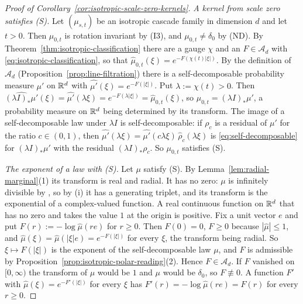 \begin{proof}[Proof of Corollary~\ref{cor:isotropic-scale-zero-kernels}]
\emph{A kernel from scale zero satisfies (S).} Let $(\mu_{s,t})$ be an isotropic cascade family in
dimension $d$ and let $t > 0$. Then $\mu_{0,t}$ is rotation invariant by (I3), and
$\mu_{0,t} \ne \delta_0$ by (ND). By Theorem~\ref{thm:isotropic-classification} there are a gauge $\chi$
and an $F \in \mathcal{A}_d$ with \ref{eq:isotropic-classification}, so that
$\widehat\mu_{0,t}(\xi) = e^{-F(\chi(t)|\xi|)}$. By the definition of $\mathcal{A}_d$
(Proposition~\ref{prop:line-filtration}) there is a self-decomposable probability measure $\mu'$ on
$\mathbb{R}^d$ with $\widehat{\mu'}(\xi) = e^{-F(|\xi|)}$. Put $\lambda := \chi(t) > 0$. Then
$\widehat{(\lambda I)_*\mu'}(\xi) = \widehat{\mu'}(\lambda\xi) = e^{-F(\lambda|\xi|)}
= \widehat\mu_{0,t}(\xi)$, so $\mu_{0,t} = (\lambda I)_*\mu'$, a probability measure on $\mathbb{R}^d$
being determined by its transform. The image of a self-decomposable law under $\lambda I$ is
self-decomposable: if $\rho_c$ is a residual of $\mu'$ for the ratio $c \in (0,1)$, then
$\widehat{\mu'}(\lambda\xi) = \widehat{\mu'}(c\lambda\xi)\,\widehat\rho_c(\lambda\xi)$ is
\ref{eq:self-decomposable} for $(\lambda I)_*\mu'$ with the residual $(\lambda I)_*\rho_c$. So
$\mu_{0,t}$ satisfies (S).

\emph{The exponent of a law with (S).} Let $\mu$ satisfy (S). By Lemma~\ref{lem:radial-marginal}(1)
its transform is real and radial. It has no zero: $\mu$ is infinitely divisible by ,
so by (i) it has a generating triplet, and its transform is the exponential of a
complex-valued function. A real continuous function on $\mathbb{R}^d$ that has no zero and takes the
value $1$ at the origin is positive. Fix a unit vector $e$ and put
$F(r) := -\log\widehat\mu(re)$ for $r \ge 0$. Then $F(0) = 0$, $F \ge 0$ because
$|\widehat\mu| \le 1$, and $\widehat\mu(\xi) = \widehat\mu(|\xi|e) = e^{-F(|\xi|)}$ for every
$\xi$, the transform being radial. So $\xi \mapsto F(|\xi|)$ is the exponent of the
self-decomposable law $\mu$, and $F$ is admissible by
Proposition~\ref{prop:isotropic-polar-reading}(2). Hence $F \in \mathcal{A}_d$. If $F$ vanished on
$[0,\infty)$ the transform of $\mu$ would be $1$ and $\mu$ would be $\delta_0$, so
$F \not\equiv 0$. A function $F'$ with $\widehat\mu(\xi) = e^{-F'(|\xi|)}$ for every $\xi$ has
$F'(r) = -\log\widehat\mu(re) = F(r)$ for every $r \ge 0$.


\end{proof}
